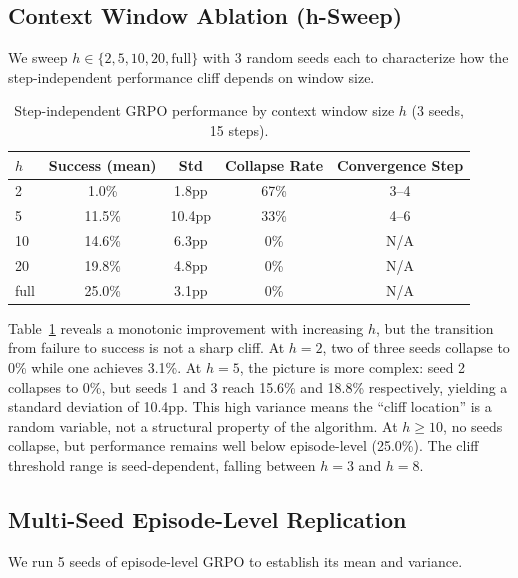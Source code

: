 \documentclass[11pt]{article}
\begin{document}
\subsection{Context Window Ablation (h-Sweep)}

We sweep $h \in \{2, 5, 10, 20, \text{full}\}$ with 3 random seeds each to characterize how the step-independent performance cliff depends on window size.

\begin{table}[h]
\centering
\caption{Step-independent GRPO performance by context window size $h$ (3 seeds, 15 steps).}
\label{tab:hsweep}
\begin{tabular}{lcccc}
\toprule
$h$ & Success (mean) & Std & Collapse Rate & Convergence Step \\
\midrule
2    & 1.0\%  & 1.8pp & 67\% & 3--4 \\
5    & 11.5\% & 10.4pp & 33\% & 4--6 \\
10   & 14.6\% & 6.3pp  & 0\%  & N/A \\
20   & 19.8\% & 4.8pp  & 0\%  & N/A \\
full & 25.0\% & 3.1pp  & 0\%  & N/A \\
\bottomrule
\end{tabular}
\end{table}

Table~\ref{tab:hsweep} reveals a monotonic improvement with increasing $h$, but the transition from failure to success is not a sharp cliff.
At $h{=}2$, two of three seeds collapse to 0\% while one achieves 3.1\%.
At $h{=}5$, the picture is more complex: seed 2 collapses to 0\%, but seeds 1 and 3 reach 15.6\% and 18.8\% respectively, yielding a standard deviation of 10.4pp.
This high variance means the ``cliff location'' is a random variable, not a structural property of the algorithm.
At $h{\geq}10$, no seeds collapse, but performance remains well below episode-level (25.0\%).
The cliff threshold range is seed-dependent, falling between $h{=}3$ and $h{=}8$.

\subsection{Multi-Seed Episode-Level Replication}

We run 5 seeds of episode-level GRPO to establish its mean and variance.
\end{document}
